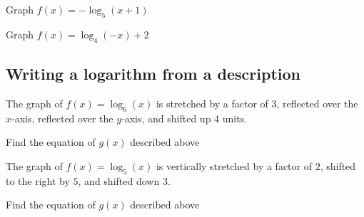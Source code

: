 \begin{exercise}
Graph $f(x)=-\log_{5}(x+1)$
\end{exercise}
\ifprintanswers
\else
\begin{center}
\end{center}
\fi
\begin{solution}[1.25in]

\end{solution}

\begin{exercise}
Graph $f(x)=\log_{4}(-x)+2$
\end{exercise}
\ifprintanswers
\else
\begin{center}
\end{center}
\fi
\begin{solution}[1.25in]

\end{solution}

\subsection{Writing a logarithm from a description}

\begin{exercise}
The graph of $f(x)=\log_6(x)$ is stretched by a factor of $3$, reflected over the $x$-axis, reflected
over the $y$-axis, and shifted up $4$ units.

\vspace{0.5em}

Find the equation of $g(x)$ described above
\end{exercise}
\begin{solution}[2in]

\end{solution}

\begin{exercise}
The graph of $f(x)=\log_5(x)$ is vertically stretched by a factor of $2$, shifted to the right by $5$,
and shifted down $3$.

\vspace{0.5em}

Find the equation of $g(x)$ described above
\end{exercise}
\begin{solution}[2in]

\end{solution}

